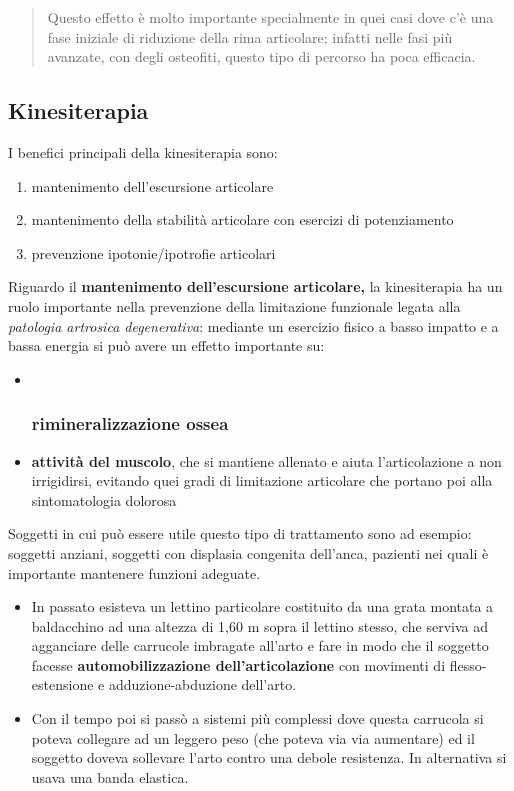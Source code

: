 \documentclass[]{article}
\begin{document}
\begin{quote}
Questo effetto è molto importante specialmente in quei casi dove c'è una
fase iniziale di riduzione della rima articolare; infatti nelle fasi più
avanzate, con degli osteofiti, questo tipo di percorso ha poca
efficacia.
\end{quote}

\subsection{Kinesiterapia}\label{kinesiterapia}

I benefici principali della kinesiterapia sono:

\begin{enumerate}
\def\labelenumi{\arabic{enumi}.}
\item
  mantenimento dell'escursione articolare
\item
  mantenimento della stabilità articolare con esercizi di potenziamento
\item
  prevenzione ipotonie/ipotrofie articolari
\end{enumerate}

Riguardo il \textbf{mantenimento dell'escursione articolare,} la
kinesiterapia ha un ruolo importante nella prevenzione della limitazione
funzionale legata alla \emph{patologia artrosica degenerativa}: mediante
un esercizio fisico a basso impatto e a bassa energia si può avere un
effetto importante su:

\begin{itemize}
\item ~
  \subsubsection{rimineralizzazione
  ossea}\label{rimineralizzazione-ossea}
\item
  \textbf{attività del muscolo}, che si mantiene allenato e aiuta
  l'articolazione a non irrigidirsi, evitando quei gradi di limitazione
  articolare che portano poi alla sintomatologia dolorosa
\end{itemize}

Soggetti in cui può essere utile questo tipo di trattamento sono ad
esempio: soggetti anziani, soggetti con displasia congenita dell'anca,
pazienti nei quali è importante mantenere funzioni adeguate.

\begin{itemize}
\item
  In passato esisteva un lettino particolare costituito da una grata
  montata a baldacchino ad una altezza di 1,60 m sopra il lettino
  stesso, che serviva ad agganciare delle carrucole imbragate all'arto e
  fare in modo che il soggetto facesse \textbf{automobilizzazione
  dell'articolazione} con movimenti di flesso-estensione e
  adduzione-abduzione dell'arto.
\item
  Con il tempo poi si passò a sistemi più complessi dove questa
  carrucola si poteva collegare ad un leggero peso (che poteva via via
  aumentare) ed il soggetto doveva sollevare l'arto contro una debole
  resistenza. In alternativa si usava una banda elastica.
\end{itemize}
\end{document}
